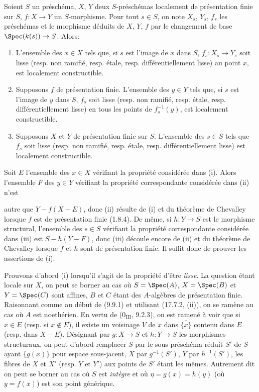 \begin{proposition}[17.7.11]
\label{IV.17.7.11}
Soient $S$ un préschéma, $X$, $Y$ deux $S$-préschémas localement de présentation finie sur $S$, $f:X\to Y$ un $S$-morphisme. Pour tout $s\in S$, on note $X_s$, $Y_s$, $f_s$ les préschémas et le morphisme déduits de $X$, $Y$, $f$ par le changement de base $\Spec(k(s))\to S$. Alors:
\begin{enumerate}
  \item[(i)] L'ensemble des $x\in X$ tels que, si $s$ est l'image de $x$ dans $S$, $f_s:X_s\to Y_s$ soit lisse (resp. non ramifié, resp. étale, resp. différentiellement lisse) au point $x$, est localement constructible.
  \item[(ii)] Supposons $f$ de présentation finie. L'ensemble des $y\in Y$ tels que, si $s$ est l'image de $y$ dans $S$, $f_s$ soit lisse (resp. non ramifié, resp. étale, resp. différentiellement lisse) en tous les points de $f_s^{-1}(y)$, est localement constructible.
  \item[(iii)] Supposons $X$ et $Y$ de présentation finie sur $S$. L'ensemble des $s\in S$ tels que $f_s$ soit lisse (resp. non ramifié, resp. étale, resp. différentiellement lisse) est localement constructible.
\end{enumerate}
\end{proposition}

Soit $E$ l'ensemble des $x\in X$ vérifiant la propriété considérée dans (i). Alors l'ensemble $F$ des $y\in Y$ vérifiant la propriété correspondante considérée dans (ii) n'est


autre que $Y-f(X-E)$, donc (ii) résulte de (i) et du théorème de Chevalley lorsque $f$ est de présentation finie (1.8.4). De même, si $h:Y\to S$ est le morphisme structural, l'ensemble des $s\in S$ vérifiant la propriété correspondante considérée dans (iii) est $S-h(Y-F)$, donc (iii) découle encore de (ii) et du théorème de Chevalley lorsque $f$ et $h$ sont de présentation finie. Il suffit donc de prouver les assertions de (i).

Prouvons d'abord (i) lorsqu'il s'agit de la propriété d'être \emph{lisse}. La question étant locale sur $X$, on peut se borner au cas où $S=\Spec(A)$, $X=\Spec(B)$ et $Y=\Spec(C)$ sont affines, $B$ et $C$ étant des $A$-algèbres de présentation finie. Raisonnant comme au début de (9.9.1) et utilisant (17.7.2, (ii)), on se ramène au cas où $A$ est noethérien. En vertu de ($0_{\mathrm{III}}$, 9.2.3), on est ramené à voir que si $x\in E$ (resp. si $x\notin E$), il existe un voisinage $V$ de $x$ dans $\overline{\{x\}}$ contenu dans $E$ (resp. dans $X-E$). Désignant par $g:X\to S$ et $h:Y\to S$ les morphismes structuraux, on peut d'abord remplacer $S$ par le sous-préschéma réduit $S'$ de $S$ ayant $\overline{\{g(x)\}}$ pour espace sous-jacent, $X$ par $g^{-1}(S')$, $Y$ par $h^{-1}(S')$, les fibres de $X$ et $X'$ (resp. $Y$ et $Y'$) aux points de $S'$ étant les mêmes. Autrement dit on peut se borner au cas où $S$ est \emph{intègre} et où $\eta=g(x)=h(y)$ (où $y=f(x)$) est son point générique.

